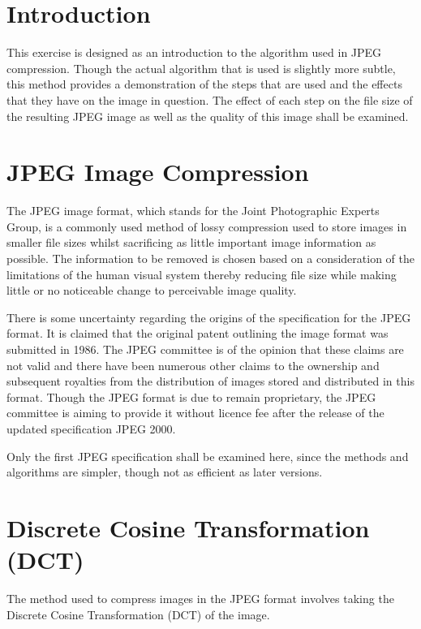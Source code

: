 
\section{Introduction} %
\label{sec:introduction}
This exercise is designed as an introduction to the algorithm used in JPEG compression. Though the actual algorithm that is used is slightly more subtle, this method provides a demonstration of the steps that are used and the effects that they have on the image in question. The effect of each step on the file size of the resulting JPEG image as well as the quality of this image shall be examined.

\section{JPEG Image Compression} %
\label{sec:jpeg_image_compression}
The JPEG image format, which stands for the Joint Photographic Experts Group, is a commonly used method of lossy compression used to store images in smaller file sizes whilst sacrificing as little important image information as possible. The information to be removed is chosen based on a consideration of the limitations of the human visual system thereby reducing file size while making little or no noticeable change to perceivable image quality.

There is some uncertainty regarding the origins of the specification for the JPEG format. It is claimed that the original patent outlining the image format was submitted in 1986. The JPEG committee is of the opinion that these claims are not valid and there have been numerous other claims to the ownership and subsequent royalties from the distribution of images stored and distributed in this format. Though the JPEG format is due to remain proprietary, the JPEG committee is aiming to provide it without licence fee after the release of the updated specification JPEG 2000.

Only the first JPEG specification shall be examined here, since the methods and algorithms are simpler, though not as efficient as later versions.

\section{Discrete Cosine Transformation (DCT)} %
\label{sec:discrete_cosine_transformation_}
The method used to compress images in the JPEG format involves taking the Discrete Cosine Transformation (DCT) of the image. 

